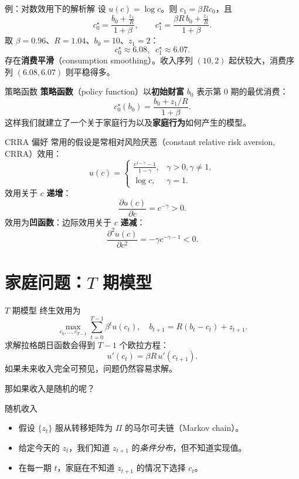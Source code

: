 \documentclass[10pt,aspectratio=169]{beamer}
\begin{document}
\begin{frame}{例：对数效用下的解析解}
  设 $u(c) = \log c$。则 $c_1 = \beta R c_0$，且
  \[
    c_0^\star = \frac{b_0 + \frac{z_1}{R}}{1+\beta},
    \qquad
    c_1^\star = \frac{\beta R \, b_0 + \frac{z_1}{R}}{1+\beta}.
  \]
  取 $\beta = 0.96$、$R = 1.04$、$b_0 = 10$、$z_1 = 2$：
  \[
    c_0^\star \approx 6.08, \;\; c_1^\star \approx 6.07.
  \]
  存在\textbf{消费平滑}（consumption smoothing）。收入序列 $(10, 2)$ 起伏较大，消费序列 $(6.08, 6.07)$ 则平稳得多。
\end{frame}

\begin{frame}{策略函数}
  \textbf{策略函数}（policy function）以\textbf{初始财富} $b_0$ 表示第 0 期的最优消费：
  \[
    c_0^\star(b_0) = \frac{b_0 + z_1/R}{1+\beta}.
  \]
  这样我们就建立了一个关于家庭行为以及\textbf{家庭行为}如何产生的模型。
\end{frame}

\begin{frame}{CRRA 偏好}
  常用的假设是常相对风险厌恶（constant relative risk aversion, CRRA）效用：
  \[
    u(c) = \begin{cases}
      \frac{c^{1-\gamma}-1}{1-\gamma}, & \gamma > 0, \gamma \neq 1, \\
      \log c, & \gamma = 1.
    \end{cases}
  \]
  效用关于 $c$ \textbf{递增}：
  \[
    \frac{\partial u(c)}{\partial c} = c^{-\gamma} > 0.
  \]
  效用为\textbf{凹函数}：边际效用关于 $c$ \textbf{递减}：
  \[
    \frac{\partial^2 u(c)}{\partial c^2} = -\gamma c^{-\gamma-1} < 0.
  \]
\end{frame}

\section{家庭问题：$T$ 期模型}

\begin{frame}{$T$ 期模型}
  终生效用为
  \[
    \max_{c_0, \ldots, c_{T-1}} \sum_{t=0}^{T-1} \beta^t u(c_t),
    \quad b_{t+1} = R(b_t - c_t) + z_{t+1}.
  \]
  求解拉格朗日函数会得到 $T-1$ 个欧拉方程：
  \[
    u'(c_t) = \beta R \, u'(c_{t+1}).
  \]
  如果未来收入完全可预见，问题仍然容易求解。

  那如果收入是随机的呢？
\end{frame}

\begin{frame}{随机收入}
  \begin{itemize}
    \item 假设 $\{z_t\}$ 服从转移矩阵为 $\Pi$ 的马尔可夫链（Markov chain）。
    \item 给定今天的 $z_t$，我们知道 $z_{t+1}$ 的\emph{条件分布}，但不知道实现值。
    \item 在每一期 $t$，家庭在不知道 $z_{t+1}$ 的情况下选择 $c_t$。
  \end{itemize}
\end{frame}
\end{document}
